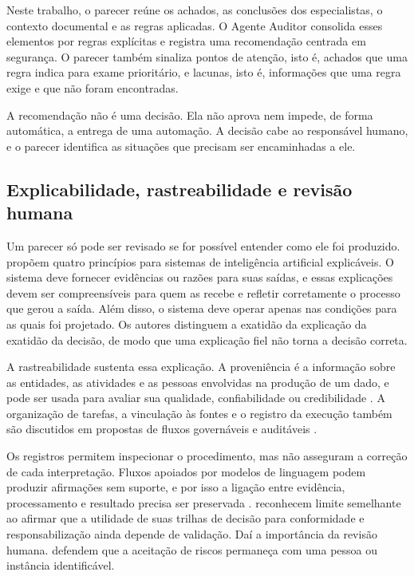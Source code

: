 Neste trabalho, o parecer reúne os achados, as conclusões dos especialistas, o contexto documental e as regras aplicadas. O Agente Auditor consolida esses elementos por regras explícitas e registra uma recomendação centrada em segurança. O parecer também sinaliza pontos de atenção, isto é, achados que uma regra indica para exame prioritário, e lacunas, isto é, informações que uma regra exige e que não foram encontradas.

A recomendação não é uma decisão. Ela não aprova nem impede, de forma automática, a entrega de uma automação. A decisão cabe ao responsável humano, e o parecer identifica as situações que precisam ser encaminhadas a ele. 

\subsection{Explicabilidade, rastreabilidade e revisão humana}
\label{rt-2-5-3}

Um parecer só pode ser revisado se for possível entender como ele foi produzido.  propõem quatro princípios para sistemas de inteligência artificial explicáveis. O sistema deve fornecer evidências ou razões para suas saídas, e essas explicações devem ser compreensíveis para quem as recebe e refletir corretamente o processo que gerou a saída. Além disso, o sistema deve operar apenas nas condições para as quais foi projetado. Os autores distinguem a exatidão da explicação da exatidão da decisão, de modo que uma explicação fiel não torna a decisão correta.

A rastreabilidade sustenta essa explicação. A proveniência é a informação sobre as entidades, as atividades e as pessoas envolvidas na produção de um dado, e pode ser usada para avaliar sua qualidade, confiabilidade ou credibilidade \cite{groth2013}. A organização de tarefas, a vinculação às fontes e o registro da execução também são discutidos em propostas de fluxos governáveis e auditáveis \cite{rousek2026}.

Os registros permitem inspecionar o procedimento, mas não asseguram a correção de cada interpretação. Fluxos apoiados por modelos de linguagem podem produzir afirmações sem suporte, e por isso a ligação entre evidência, processamento e resultado precisa ser preservada \cite{rousek2026}.  reconhecem limite semelhante ao afirmar que a utilidade de suas trilhas de decisão para conformidade e responsabilização ainda depende de validação. Daí a importância da revisão humana.  defendem que a aceitação de riscos permaneça com uma pessoa ou instância identificável.

